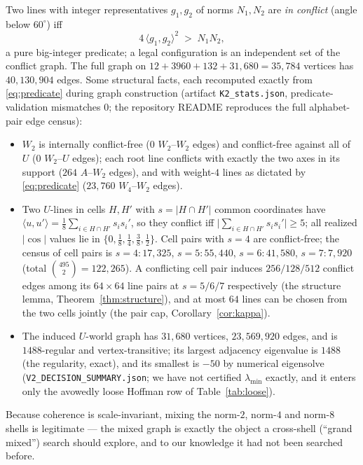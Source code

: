 \documentclass[11pt]{article}
\theoremstyle{remark}
\begin{document}
Two lines with integer representatives $g_1,g_2$ of norms $N_1,N_2$ are
\emph{in conflict} (angle below $60^\circ$) iff
\begin{equation}\label{eq:predicate}
4\,\langle g_1,g_2\rangle^2 \;>\; N_1 N_2 ,
\end{equation}
a pure big-integer predicate; a legal configuration is an independent set
of the conflict graph. The full graph on
$12+3960+132+31{,}680=35{,}784$ vertices has $40{,}130{,}904$ edges. Some
structural facts, each recomputed exactly from \eqref{eq:predicate} during
graph construction (artifact \texttt{K2\_stats.json}, predicate-validation
mismatches $0$; the repository README reproduces the full alphabet-pair
edge census):
\begin{itemize}
\item $W_2$ is internally conflict-free ($0$ $W_2$--$W_2$ edges) and
conflict-free against all of $U$ ($0$ $W_2$--$U$ edges); each root line
conflicts with exactly the two axes in its support ($264$ $A$--$W_2$
edges), and with weight-$4$ lines as dictated by \eqref{eq:predicate}
($23{,}760$ $W_4$--$W_2$ edges).
\item Two $U$-lines in cells $H,H'$ with $s=|H\cap H'|$ common coordinates
have $\langle u,u'\rangle=\tfrac18\sum_{i\in H\cap H'}s_is_i'$, so they
conflict iff $\bigl|\sum_{i\in H\cap H'}s_is_i'\bigr|\ge 5$; all realized
$|\cos|$ values lie in $\{0,\tfrac18,\tfrac14,\tfrac38,\tfrac12\}$.
Cell pairs with $s=4$ are conflict-free; the census of cell pairs is
$s{=}4\!:17{,}325$, $s{=}5\!:55{,}440$, $s{=}6\!:41{,}580$,
$s{=}7\!:7{,}920$ (total $\binom{495}{2}=122{,}265$). A conflicting
cell pair induces $256/128/512$ conflict edges among its $64\times64$
line pairs at $s=5/6/7$ respectively (the structure lemma,
Theorem~\ref{thm:structure}), and at most $64$ lines can be chosen
from the two cells jointly (the pair cap, Corollary~\ref{cor:kappa}).
\item The induced $U$-world graph has $31{,}680$ vertices,
$23{,}569{,}920$ edges, and is $1488$-regular and vertex-transitive; its
largest adjacency eigenvalue is $1488$ (the regularity, exact), and its
smallest is $-50$ by numerical eigensolve
(\texttt{V2\_DECISION\_SUMMARY.json}; we have not certified
$\lambda_{\min}$ exactly, and it enters only the avowedly loose Hoffman row
of Table~\ref{tab:loose}).
\end{itemize}

Because coherence is scale-invariant, mixing the norm-$2$, norm-$4$ and
norm-$8$ shells is legitimate --- the mixed graph is exactly the object a
cross-shell (``grand mixed'') search should explore, and to our knowledge
it had not been searched before.
\end{document}
